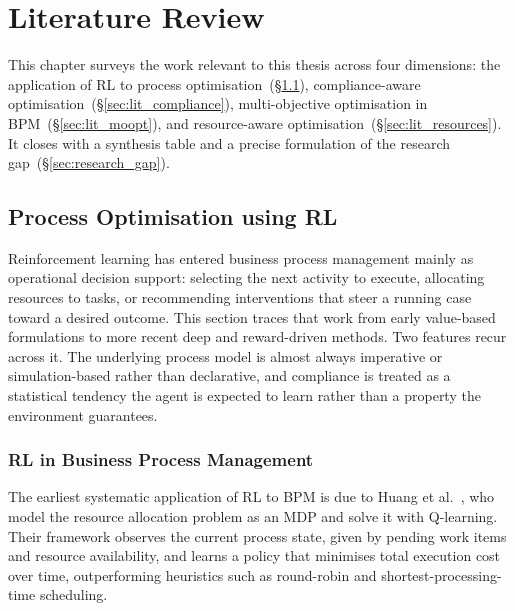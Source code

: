 
\chapter{Literature Review}
\label{chap:literarture}

This chapter surveys the work relevant to this thesis across four
dimensions: the application of \ac{RL} to process
optimisation~(\S\ref{sec:lit_rl_bpm}), compliance-aware
optimisation~(\S\ref{sec:lit_compliance}), multi-objective optimisation
in \ac{BPM}~(\S\ref{sec:lit_moopt}), and resource-aware
optimisation~(\S\ref{sec:lit_resources}). It closes with a synthesis
table and a precise formulation of the research
gap~(\S\ref{sec:research_gap}).

\section{Process Optimisation using RL}
\label{sec:lit_rl_bpm}
Reinforcement learning has entered business process management mainly as
operational decision support: selecting the next activity to execute,
allocating resources to tasks, or recommending interventions that steer
a running case toward a desired outcome. This section traces that work
from early value-based formulations to more recent deep and
reward-driven methods. Two features recur across it. The underlying
process model is almost always imperative or simulation-based rather
than declarative, and compliance is treated as a statistical tendency
the agent is expected to learn rather than a property the environment
guarantees.

\subsection{RL in Business Process Management}

The earliest systematic application of \ac{RL} to \ac{BPM} is due to
Huang et al.~\cite{Huang2011ReinforcementManagement}, who model the
resource allocation problem as an \ac{MDP} and solve it with
Q-learning. Their framework observes the current process state, given by
pending work items and resource availability, and learns a policy that
minimises total execution cost over time, outperforming heuristics such
as round-robin and shortest-processing-time scheduling.

